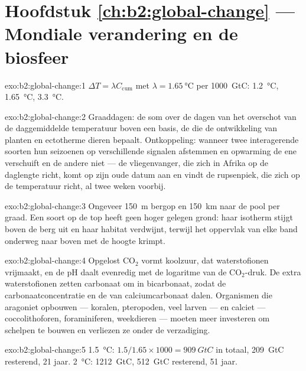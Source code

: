 \section*{Hoofdstuk \ref{ch:b2:global-change} --- Mondiale verandering en de biosfeer}

\begin{solution}{exo:b2:global-change:1}
$\Delta T = \lambda C_{\text{cum}}$ met $\lambda = \qty{1.65}{\celsius}$
per \qty{1000}{GtC}: \qty{1.2}{\celsius}, \qty{1.65}{\celsius},
\qty{3.3}{\celsius}.
\end{solution}

\begin{solution}{exo:b2:global-change:2}
Graaddagen: de som over de dagen van het overschot van de daggemiddelde
temperatuur boven een basis, de  die de ontwikkeling
van planten en ectotherme dieren bepaalt. Ontkoppeling: wanneer twee
interagerende soorten hun seizoenen op verschillende signalen afstemmen en
opwarming de ene verschuift en de andere niet --- de vliegenvanger, die zich in
Afrika op de daglengte richt, komt op zijn oude datum aan en vindt de
rupsenpiek, die zich op de temperatuur richt, al twee weken voorbij.
\end{solution}

\begin{solution}{exo:b2:global-change:3}
Ongeveer \qty{150}{m} bergop en \qty{150}{km} naar de pool per graad. Een
soort op de top heeft geen hoger gelegen grond: haar isotherm stijgt
boven de berg uit en haar habitat verdwijnt, terwijl het oppervlak van
elke band onderweg naar boven met de hoogte krimpt.
\end{solution}

\begin{solution}{exo:b2:global-change:4}
Opgelost \ensuremath{\mathrm{CO_2}} vormt koolzuur, dat
waterstofionen vrijmaakt, en de pH daalt evenredig met de
logaritme van de \ensuremath{\mathrm{CO_2}}-druk. De extra
waterstofionen zetten carbonaat om in bicarbonaat, zodat de
carbonaatconcentratie en de  van calciumcarbonaat dalen.
Organismen die aragoniet opbouwen --- koralen, pteropoden, veel larven
--- en calciet --- coccolithoforen, foraminiferen, weekdieren ---
moeten meer investeren om schelpen te bouwen en verliezen ze onder de verzadiging.
\end{solution}

\begin{solution}{exo:b2:global-change:5}
\qty{1.5}{\celsius}: $1.5/1.65\times 1000 = \qty{909}{GtC}$ in totaal,
\qty{209}{GtC} resterend, 21 jaar. \qty{2}{\celsius}:
\qty{1212}{GtC}, \qty{512}{GtC} resterend, 51 jaar.
\end{solution}

